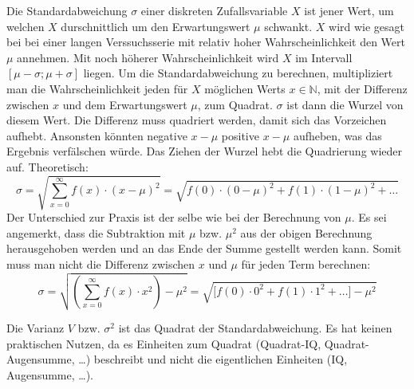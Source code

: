 Die Standardabweichung $\sigma$ einer diskreten Zufallsvariable $X$ ist jener Wert, um welchen $X$ durschnittlich um den Erwartungswert $\mu$ schwankt. $X$ wird wie gesagt bei bei einer langen Verssuchsserie mit relativ hoher Wahrscheinlichkeit den Wert $\mu$ annehmen. Mit noch h\"{o}herer Wahrscheinlichkeit wird $X$ im Intervall $[\mu - \sigma ; \mu + \sigma]$ liegen. Um die Standardabweichung zu berechnen, multipliziert man die Wahrscheinlichkeit jeden f\"{u}r $X$ m\"{o}glichen Werts $x \in \mathbb{N}$, mit der Differenz zwischen $x$ und dem Erwartungswert $\mu$, zum Quadrat. $\sigma$ ist dann die Wurzel von diesem Wert. Die Differenz muss quadriert werden, damit sich das Vorzeichen aufhebt. Ansonsten k\"{o}nnten negative $x - \mu$ positive $x - \mu$ aufheben, was das Ergebnis verf\"{a}lschen w\"{u}rde. Das Ziehen der Wurzel hebt die Quadrierung wieder auf. Theoretisch: $$\sigma = \sqrt{\sum_{x=0}^{\infty} f(x) \cdot (x - \mu)^2} = \sqrt{f(0) \cdot (0 - \mu)^2 + f(1) \cdot (1 - \mu)^2 + \dots}$$ Der Unterschied zur Praxis ist der selbe wie bei der Berechnung von $\mu$. Es sei angemerkt, dass die Subtraktion mit $\mu$ bzw. $\mu^2$ aus der obigen Berechnung herausgehoben werden und an das Ende der Summe gestellt werden kann. Somit muss man nicht die Differenz zwischen $x$ und $\mu$ f\"{u}r jeden Term berechnen: $$\sigma = \sqrt{\left( \sum_{x=0}^{\infty} f(x) \cdot x^2\right) - \mu^2} = \sqrt{\big[ f(0) \cdot 0^2 + f(1) \cdot 1^2 + \dots \big] - \mu^2}$$

Die Varianz $V$ bzw. $\sigma^2$ ist das Quadrat der Standardabweichung. Es hat keinen praktischen Nutzen, da es Einheiten zum Quadrat (Quadrat-IQ, Quadrat-Augensumme, \dots) beschreibt und nicht die eigentlichen Einheiten (IQ, Augensumme, \dots).


